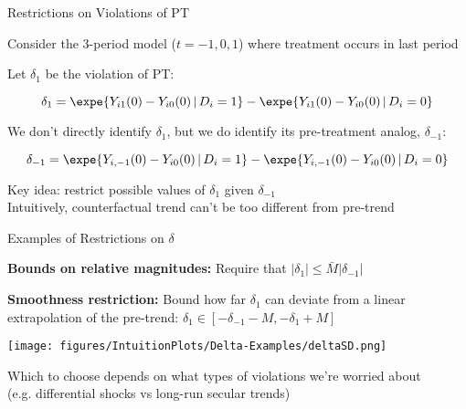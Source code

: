 \documentclass[aspectratio = 169, 13pt]{beamer}
\begin{document}
\begin{frame}{Restrictions on Violations of PT}
	\begin{wideitemize}
		
		\item
		Consider the 3-period model ($t=-1,0,1$) where treatment occurs in last period
		
		\item
		Let $\delta_1$ be the violation of PT:
		
		$$\delta_1 = \expe{ Y_{i1}(0) - Y_{i0}(0) \,|\, D_i = 1} - \expe{ Y_{i1}(0) - Y_{i0}(0) \,|\, D_i = 0} $$
		
		\item
		We don't directly identify $\delta_1$, but we do identify its pre-treatment analog, $\delta_{-1}$:
		
		$$\delta_{-1} = \expe{ Y_{i,-1}(0) - Y_{i0}(0) \,|\, D_i = 1} - \expe{ Y_{i,-1}(0) - Y_{i0}(0) \,|\, D_i = 0} $$
		
		\item
		Key idea: restrict possible values of $\delta_1$ given $\delta_{-1}$ \\
		
		Intuitively, counterfactual trend can't be too different from pre-trend
		
	\end{wideitemize}
\end{frame}


\begin{frame}{Examples of Restrictions on $\delta$}
	\begin{wideitemize}
		
		\item \textbf{Bounds on relative magnitudes:} Require that $|\delta_1| \leq \bar{M} |\delta_{-1}|$
		
		\pause
		
		\item \textbf{Smoothness restriction:} Bound how far $\delta_1$ can deviate from a linear extrapolation of the pre-trend: $\delta_1 \in [-\delta_{-1}-M , -\delta_{1} + M]$
		
	\end{wideitemize}
	
	\centering
	\texttt{[image: figures/IntuitionPlots/Delta-Examples/deltaSD.png]}
	
	\begin{wideitemize}
		\item
		Which to choose depends on what types of violations we're worried about \\(e.g. differential shocks vs long-run secular trends)
	\end{wideitemize}
	\pause 
\end{frame}
\end{document}

